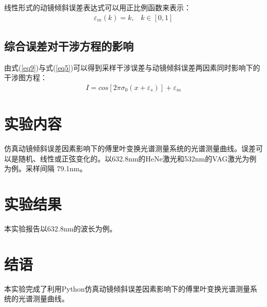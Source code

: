 \documentclass[conference]{IEEEtran}
\begin{document}
线性形式的动镜倾斜误差表达式可以用正比例函数来表示：
\begin{align}
    \varepsilon_m(k) = k, \;\;\; k \in [0, 1] \label{eq8}
\end{align}

\subsection{综合误差对干涉方程的影响}
由式(\ref{eq9})与式(\ref{eq5})可以得到采样干涉误差与动镜倾斜误差两因素同时影响下的干涉图方程：
\begin{align}
    I = cos\left[2\pi\sigma_0(x + \varepsilon_s)\right] + \varepsilon_m    \label{eq11}
\end{align}

\section{实验内容}
仿真动镜倾斜误差因素影响下的傅里叶变换光谱测量系统的光谱测量曲线。误差可以是随机、线性或正弦变化的。以632.8nm的HeNe激光和532nm的VAG激光为例为例。采样间隔 79.1nm。


\section{实验结果}
本实验报告以632.8nm的波长为例。


\section{结语}
本实验完成了利用Python仿真动镜倾斜误差因素影响下的傅里叶变换光谱测量系统的光谱测量曲线。
\end{document}

